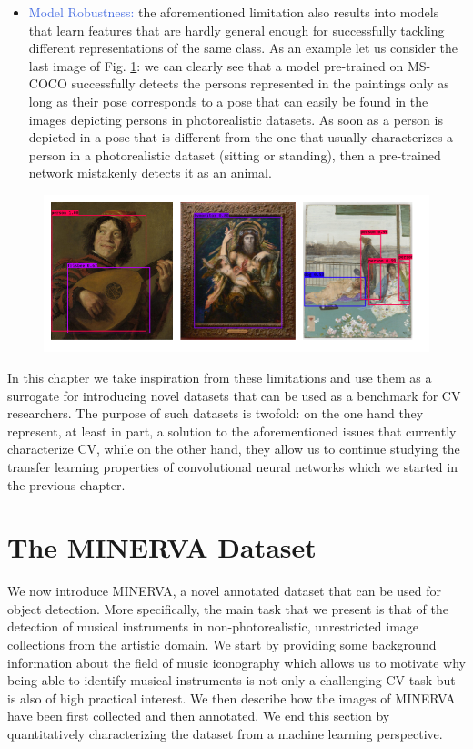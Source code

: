 \begin{itemize}
	\item \textcolor{RoyalBlue}{Model Robustness:} the aforementioned limitation also results into models that learn features that are hardly general enough for successfully tackling different representations of the same class. As an example let us consider the last image of Fig. \ref{fig:fails}: we can clearly see that a model pre-trained on MS-COCO successfully detects the persons represented in the paintings only as long as their pose corresponds to a pose that can easily be found in the images depicting persons in photorealistic datasets. As soon as a person is depicted in a pose that is different from the one that usually characterizes a person in a photorealistic dataset (sitting or standing), then a pre-trained network mistakenly detects it as an animal.   
\end{itemize}

\begin{figure}[ht!]
\centering
  \includegraphics[width=\linewidth]{./Images/Chapter05/fails}
  \caption{}
  \label{fig:fails}
\end{figure}

In this chapter we take inspiration from these limitations and use them as a surrogate for introducing novel datasets that can be used as a benchmark for CV researchers. The purpose of such datasets is twofold: on the one hand they represent, at least in part, a solution to the aforementioned issues that currently characterize CV, while on the other hand, they allow us to continue studying the transfer learning properties of convolutional neural networks which we started in the previous chapter.  

\section{The MINERVA Dataset}
\label{sec:minerva_dataset}

We now introduce MINERVA, a novel annotated dataset that can be used for object detection. More specifically, the main task that we present is that of the detection of musical instruments in non-photorealistic, unrestricted image collections from the artistic domain. We start by providing some background information about the field of music iconography which allows us to motivate why being able to identify musical instruments is not only a challenging CV task but is also of high practical interest. We then describe how the images of MINERVA have been first collected and then annotated. We end this section by quantitatively characterizing the dataset from a machine learning perspective.    

